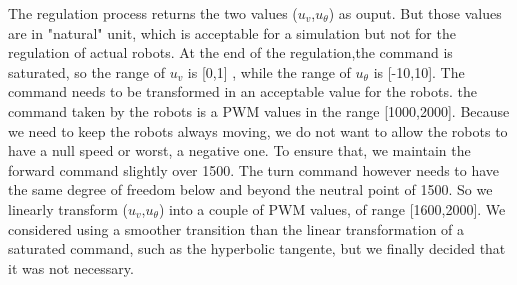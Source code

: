 The regulation process returns the two values ($u_v$,$u_{\theta}$) as ouput. But those values are in "natural" unit, which is acceptable for a simulation but not for the regulation of actual robots.
At the end of the regulation,the command is saturated, so the range of $u_v$ is [0,1] , while the range of $u_{\theta}$ is [-10,10].
The command needs to be transformed in an acceptable value for the robots.
the command taken by the robots is a PWM values in the range [1000,2000]. Because we need to keep the robots always moving, we do not want to allow the robots to have a null speed or worst, a negative one.
To ensure that, we maintain the forward command slightly over 1500. The turn command however needs to have the same degree of freedom below and beyond the neutral point of 1500.
So we linearly transform  ($u_v$,$u_{\theta}$) into a couple of PWM values, of range [1600,2000]\times [1000,2000]. 
We considered using a smoother transition than the linear transformation of a saturated command, such as the hyperbolic tangente, but we finally decided that it was not necessary.
